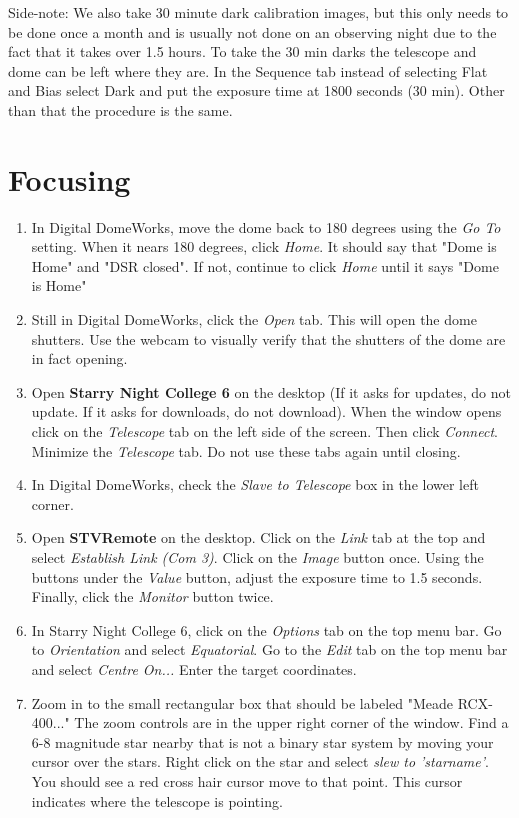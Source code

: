 \documentclass[11pt]{report}
\begin{document}
Side-note: We also take 30 minute dark calibration images, but this only needs to be done once a month and is usually not done on an observing night due to the fact that it takes over 1.5 hours. To take the 30 min darks the telescope and dome can be left where they are. In the Sequence tab instead of selecting Flat and Bias select Dark and put the exposure time at 1800 seconds (30 min). Other than that the procedure is the same. 

\section{Focusing}

\begin{enumerate}
\item In Digital DomeWorks, move the dome back to 180 degrees using the \emph{Go To} setting. When it nears 180 degrees, click \emph{Home}. It should say that "Dome is Home" and "DSR closed". If not, continue to click \emph{Home} until it says "Dome is Home"
\item Still in Digital DomeWorks, click the \emph{Open} tab. This will open the dome shutters. Use the webcam to visually verify that the shutters of the dome are in fact opening. 
\item Open {\bf Starry Night College 6} on the desktop (If it asks for updates, do not update. If it asks for downloads, do not download). When the window opens click on the \emph{Telescope} tab on the left side of the screen. Then click \emph{Connect}. Minimize the \emph{Telescope} tab. Do not use these tabs again until closing.
\item In Digital DomeWorks, check the \emph{Slave to Telescope} box in the lower left corner. 
\item Open {\bf STVRemote} on the desktop. Click on the \emph{Link} tab at the top and select \emph{Establish Link (Com 3)}. Click on the \emph{Image} button once. Using the buttons under the \emph{Value} button, adjust the exposure time to 1.5 seconds. Finally, click the \emph{Monitor} button twice. 
\item In Starry Night College 6, click on the \emph{Options} tab on the top menu bar. Go to \emph{Orientation} and select \emph{Equatorial}. Go to the \emph{Edit} tab on the top menu bar and select \emph{Centre On...} Enter the target coordinates. 
\item Zoom in to the small rectangular box that should be labeled "Meade RCX-400..." The zoom controls are in the upper right corner of the window. Find a 6-8 magnitude star nearby that is not a binary star system by moving your cursor over the stars. Right click on the star and select \emph{slew to 'starname'}. You should see a red cross hair cursor move to that point. This cursor indicates where the telescope is pointing. 

\end{enumerate}
\end{document}
